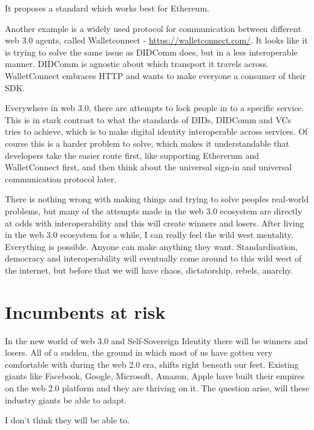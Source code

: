 It proposes a standard which works best for Ethereum.

Another example is a widely used protocol for communication between
different web 3.0 agents, called Walletconnect -
\url{https://walletconnect.com/}. It looks like it is trying to solve
the same issue as DIDComm does, but in a less interoperable manner.
DIDComm is agnostic about which transport it travels across.
WalletConnect embraces HTTP and wants to make everyone a consumer of
their SDK.

Everywhere in web 3.0, there are attempts to lock people in to a
specific service. This is in stark contrast to what the standards of
DIDs, DIDComm and VCs tries to achieve, which is to make digital
identity interoperable across services. Of course this is a harder
problem to solve, which makes it understandable that developers take the
easier route first, like supporting Ethererum and WalletConnect first,
and then think about the universal sign-in and universal communication
protocol later.

There is nothing wrong with making things and trying to solve peoples
real-world problems, but many of the attempts made in the web 3.0
ecosystem are directly at odds with interoperability and this will
create winners and losers. After living in the web 3.0 ecosystem for a
while, I can really feel the wild west mentality. Everything is
possible. Anyone can make anything they want. Standardisation, democracy
and interoperability will eventually come around to this wild west of
the internet, but before that we will have chaos, dictatorship, rebels,
anarchy.

\hypertarget{incumbents-at-risk}{%
\section{Incumbents at risk}\label{incumbents-at-risk}}

In the new world of web 3.0 and Self-Sovereign Identity there will be
winners and losers. All of a sudden, the ground in which most of us have
gotten very comfortable with during the web 2.0 era, shifts right
beneath our feet. Existing giants like Facebook, Google, Microsoft,
Amazon, Apple have built their empires on the web 2.0 platform and they
are thriving on it. The question arise, will these industry giants be
able to adapt.

I don't think they will be able to.

